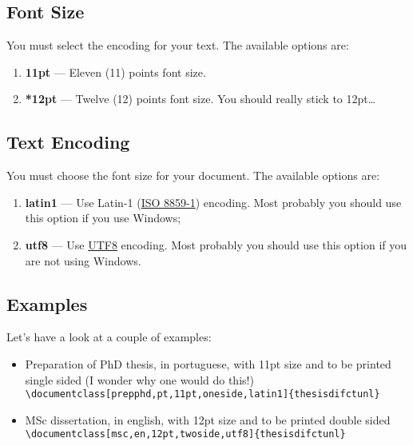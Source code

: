 \subsection{Font Size} %
\label{ssec:font_size}

You must select the encoding for your text. The available options are:
\begin{enumerate}
	\item \textbf{11pt} --- Eleven (11) points font size.
	\item \textbf{*12pt} --- Twelve (12) points font size. You should really stick to 12pt\ldots
\end{enumerate}

\subsection{Text Encoding} %
\label{ssec:text_encoding}

You must choose the font size for your document. The available options are:
\begin{enumerate}
	\item \textbf{latin1} --- Use Latin-1 (\href{http://en.wikipedia.org/wiki/ISO/IEC_8859-1}{ISO 8859-1}) encoding.  Most probably you should use this option if you use Windows;
	\item \textbf{utf8} --- Use \href{http://en.wikipedia.org/wiki/UTF-8}{UTF8} encoding.    Most probably you should use this option if you are not using Windows.
\end{enumerate}

\subsection{Examples} %
\label{ssec:examples}

Let's have a look at a couple of examples:

\begin{itemize}
	\item Preparation of PhD thesis, in portuguese, with 11pt size and to be printed single sided (I wonder why one would do this!)\\
	\verb!\documentclass[prepphd,pt,11pt,oneside,latin1]{thesisdifctunl}!
	\item MSc dissertation, in english, with 12pt size and to be printed double sided\\
	\verb!\documentclass[msc,en,12pt,twoside,utf8]{thesisdifctunl}!
\end{itemize}

